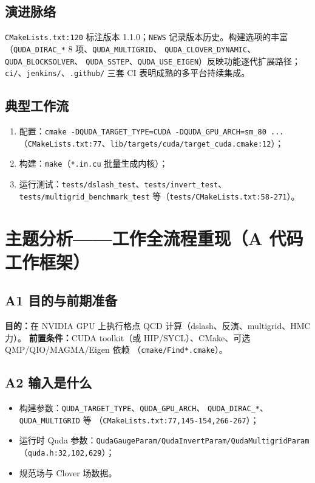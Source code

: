 \documentclass[UTF8]{ctexart}
\begin{document}
\subsection{演进脉络}
\nolinkurl{CMakeLists.txt:120} 标注版本 1.1.0；\texttt{NEWS} 记录版本历史。构建选项的丰富
（\nolinkurl{QUDA_DIRAC_*} 8 项、\nolinkurl{QUDA_MULTIGRID}、
\nolinkurl{QUDA_CLOVER_DYNAMIC}、\nolinkurl{QUDA_BLOCKSOLVER}、
\nolinkurl{QUDA_SSTEP}、\nolinkurl{QUDA_USE_EIGEN}）反映功能逐代扩展路径；
\texttt{ci/}、\texttt{jenkins/}、\texttt{.github/} 三套 CI 表明成熟的多平台持续集成。

\subsection{典型工作流}
\begin{enumerate}
  \item 配置：\nolinkurl{cmake -DQUDA_TARGET_TYPE=CUDA -DQUDA_GPU_ARCH=sm_80 ...}
        （\texttt{CMakeLists.txt:77}、\nolinkurl{lib/targets/cuda/target_cuda.cmake:12}）；
  \item 构建：\texttt{make}（\texttt{*.in.cu} 批量生成内核）；
  \item 运行测试：\nolinkurl{tests/dslash_test}、\nolinkurl{tests/invert_test}、
        \nolinkurl{tests/multigrid_benchmark_test} 等（\nolinkurl{tests/CMakeLists.txt:58-271}）。
\end{enumerate}

\section{主题分析——工作全流程重现（A 代码工作框架）}

\subsection{A1 目的与前期准备}
\textbf{目的：}在 NVIDIA GPU 上执行格点 QCD 计算（dslash、反演、multigrid、HMC 力）。
\textbf{前置条件：}CUDA toolkit（或 HIP/SYCL）、CMake、可选 QMP/QIO/MAGMA/Eigen 依赖
（\texttt{cmake/Find*.cmake}）。

\subsection{A2 输入是什么}
\begin{itemize}
  \item 构建参数：\nolinkurl{QUDA_TARGET_TYPE}、\nolinkurl{QUDA_GPU_ARCH}、
        \nolinkurl{QUDA_DIRAC_*}、\nolinkurl{QUDA_MULTIGRID} 等
        （\nolinkurl{CMakeLists.txt:77,145-154,266-267}）；
  \item 运行时 Quda 参数：\nolinkurl{QudaGaugeParam/QudaInvertParam/QudaMultigridParam}
        （\nolinkurl{quda.h:32,102,629}）；
  \item 规范场与 Clover 场数据。
\end{itemize}
\end{document}
